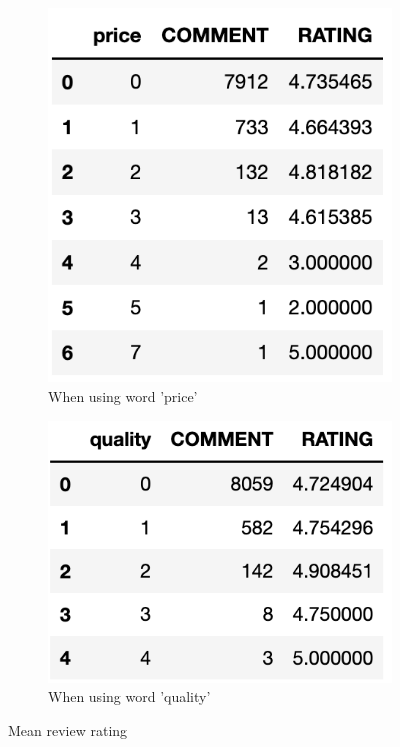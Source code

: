 \documentclass[11pt, letterpaper]{article}
\begin{document}
\begin{figure}[H]%
\centering
\begin{subfigure}[b]{0.45\textwidth}
     \centering
         \includegraphics[width=\textwidth]{eda_by_price.png}
         \caption{When using word 'price'}
         \label{fig:eda_by_price}
\end{subfigure}
\hfill
\begin{subfigure}[b]{0.45\textwidth}
         \centering
         \includegraphics[width=\textwidth]{eda_by_quality.png}
         \caption{When using word 'quality'}
         \label{fig:eda_by_quality}
\end{subfigure}
         \caption{Mean review rating}
         \label{fig:eda_review_rating_demographics}
\end{figure}
\end{document}
